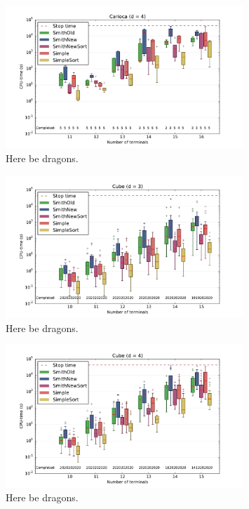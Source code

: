 \begin{figure}[htbp]
  \centering
  \includegraphics[width=0.8\textwidth]{gfx/boxplots/plot_nvst_boxplot_d4_Carioca_1}
  \caption[Box-plot for Carioca with $d = 4$]{Here be dragons.\label{fig:boxplot-carioca-d4}}
\end{figure}

\begin{figure}[htbp]
  \centering
  \includegraphics[width=0.8\textwidth]{gfx/boxplots/plot_nvst_boxplot_d3_Cube_1}
  \caption[Box-plot for Cube with $d = 3$]{Here be dragons.\label{fig:boxplot-cube-d3}}
\end{figure}

\begin{figure}[htbp]
  \centering
  \includegraphics[width=0.8\textwidth]{gfx/boxplots/plot_nvst_boxplot_d4_Cube_1}
  \caption[Box-plot for Cube with $d = 4$]{Here be dragons.\label{fig:boxplot-cube-d4}}
\end{figure}

